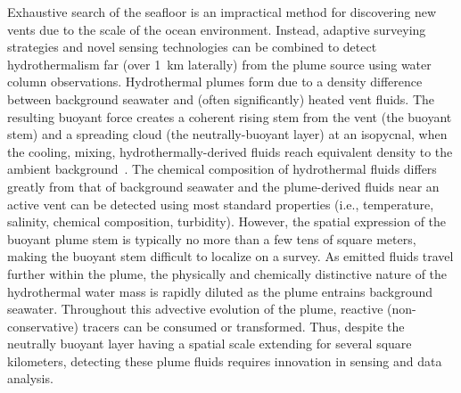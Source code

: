 Exhaustive search of the seafloor is an impractical method for discovering new vents due to the scale of the ocean environment. Instead, adaptive surveying strategies and novel sensing technologies can be combined to detect hydrothermalism far (over \SI{1}{\kilo\meter} laterally) from the plume source using water column observations. Hydrothermal plumes form due to a density difference between background seawater and (often significantly) heated vent fluids. The resulting buoyant force creates a coherent rising stem from the vent (the buoyant stem) and a spreading cloud (the neutrally-buoyant layer) at an isopycnal, when the cooling, mixing, hydrothermally-derived fluids reach equivalent density to the ambient background~\autocite{morton1956turbulent, speer1989model}. The chemical composition of hydrothermal fluids differs greatly from that of background seawater and the plume-derived fluids near an active vent can be detected using most standard properties (i.e., temperature, salinity, chemical composition, turbidity). However, the spatial expression of the buoyant plume stem is typically no more than a few tens of square meters, making the buoyant stem difficult to localize on a survey. As emitted fluids travel further within the plume, the physically and chemically distinctive nature of the hydrothermal water mass is rapidly diluted as the plume entrains background seawater. Throughout this advective evolution of the plume, reactive (non-conservative) tracers can be consumed or transformed. Thus, despite the neutrally buoyant layer having a spatial scale extending for several square kilometers, detecting these plume fluids requires innovation in sensing and data analysis.

